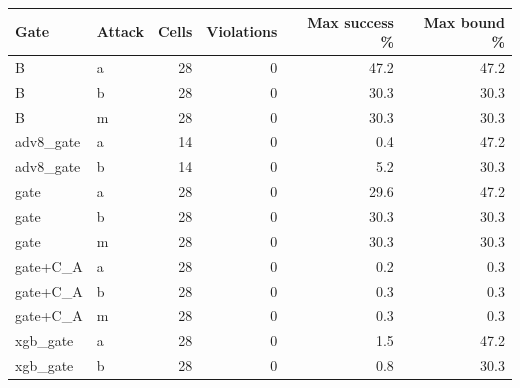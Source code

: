 \begin{tabular}{llrrrr}
\toprule
Gate & Attack & Cells & Violations & Max success \% & Max bound \% \\
\midrule
B & a & 28 & 0 & 47.2 & 47.2 \\
B & b & 28 & 0 & 30.3 & 30.3 \\
B & m & 28 & 0 & 30.3 & 30.3 \\
adv8\_gate & a & 14 & 0 & 0.4 & 47.2 \\
adv8\_gate & b & 14 & 0 & 5.2 & 30.3 \\
gate & a & 28 & 0 & 29.6 & 47.2 \\
gate & b & 28 & 0 & 30.3 & 30.3 \\
gate & m & 28 & 0 & 30.3 & 30.3 \\
gate+C\_A & a & 28 & 0 & 0.2 & 0.3 \\
gate+C\_A & b & 28 & 0 & 0.3 & 0.3 \\
gate+C\_A & m & 28 & 0 & 0.3 & 0.3 \\
xgb\_gate & a & 28 & 0 & 1.5 & 47.2 \\
xgb\_gate & b & 28 & 0 & 0.8 & 30.3 \\
\bottomrule
\end{tabular}
